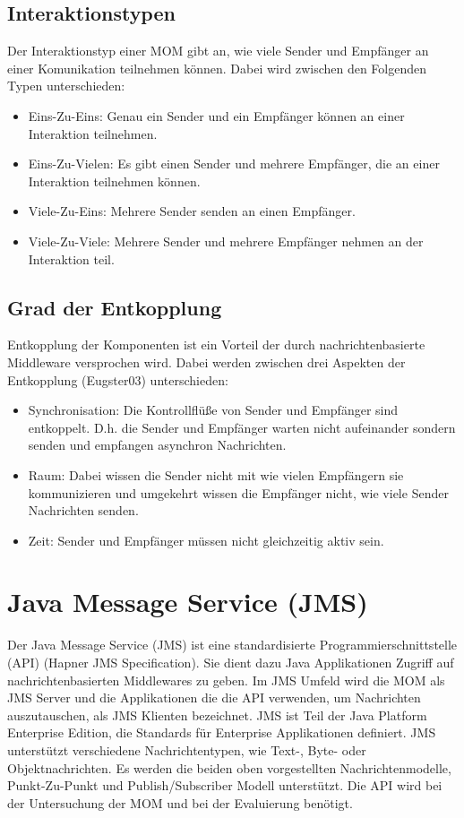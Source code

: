 \subsection{Interaktionstypen}
Der Interaktionstyp einer MOM gibt an, wie viele Sender und Empfänger an einer Komunikation teilnehmen können. Dabei wird zwischen den Folgenden Typen unterschieden:
\begin{itemize}
    \item Eins-Zu-Eins: Genau ein Sender und ein Empfänger können an einer Interaktion teilnehmen.
    \item Eins-Zu-Vielen: Es gibt einen Sender und mehrere Empfänger, die an einer Interaktion teilnehmen können. 
    \item Viele-Zu-Eins: Mehrere Sender senden an einen Empfänger.
    \item Viele-Zu-Viele: Mehrere Sender und mehrere Empfänger nehmen an der Interaktion teil.
\end{itemize}

\subsection{Grad der Entkopplung}
Entkopplung der Komponenten ist ein Vorteil der durch nachrichtenbasierte Middleware versprochen wird. Dabei werden zwischen drei Aspekten der Entkopplung (Eugster03) unterschieden:
\begin{itemize}
    \item Synchronisation: Die Kontrollflüße von Sender und Empfänger sind entkoppelt. D.h. die Sender und Empfänger warten nicht aufeinander sondern senden und empfangen asynchron Nachrichten.
    \item Raum: Dabei wissen die Sender nicht mit wie vielen Empfängern sie kommunizieren und umgekehrt wissen die Empfänger nicht, wie viele Sender Nachrichten senden.
    \item Zeit: Sender und Empfänger müssen nicht gleichzeitig aktiv sein.
\end{itemize}
\section{Java Message Service (JMS)}
Der Java Message Service (JMS) ist eine standardisierte Programmierschnittstelle (API) (Hapner JMS Specification). Sie dient dazu Java Applikationen Zugriff auf nachrichtenbasierten Middlewares zu geben. Im JMS Umfeld wird die MOM als JMS Server und die Applikationen die die API verwenden, um Nachrichten auszutauschen, als JMS Klienten bezeichnet. JMS ist Teil der Java Platform Enterprise Edition, die Standards für Enterprise Applikationen definiert. JMS unterstützt verschiedene Nachrichtentypen, wie Text-, Byte- oder Objektnachrichten. Es werden die beiden oben vorgestellten Nachrichtenmodelle, Punkt-Zu-Punkt und Publish/Subscriber Modell unterstützt.
Die API wird bei der Untersuchung der MOM und bei der Evaluierung benötigt.

